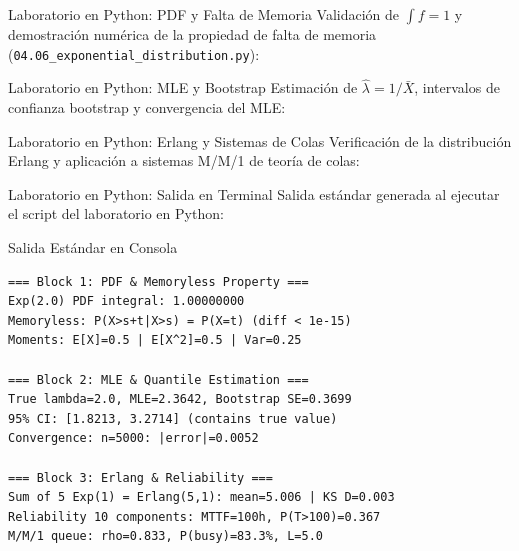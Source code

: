 \documentclass[10pt, aspectratio=169]{beamer}
\begin{document}
\begin{frame}[fragile]{Laboratorio en Python: PDF y Falta de Memoria}
  \scriptsize
  Validación de $\int f = 1$ y demostración numérica de la propiedad de falta de memoria (\texttt{04.06\_exponential\_distribution.py}):
  \vspace{0.02cm}
  {
  }
\end{frame}

\begin{frame}[fragile]{Laboratorio en Python: MLE y Bootstrap}
  \scriptsize
  Estimación de $\hat{\lambda} = 1/\bar{X}$, intervalos de confianza bootstrap y convergencia del MLE:
  \vspace{0.02cm}
  {
  }
\end{frame}

\begin{frame}[fragile]{Laboratorio en Python: Erlang y Sistemas de Colas}
  \scriptsize
  Verificación de la distribución Erlang y aplicación a sistemas M/M/1 de teoría de colas:
  \vspace{0.02cm}
  {
  }
\end{frame}

\begin{frame}[fragile]{Laboratorio en Python: Salida en Terminal}
  \scriptsize
  Salida estándar generada al ejecutar el script del laboratorio en Python:
  \vspace{0.02cm}
  \begin{block}{Salida Estándar en Consola}
    \fontsize{4pt}{5pt}\selectfont
    \begin{verbatim}
=== Block 1: PDF & Memoryless Property ===
Exp(2.0) PDF integral: 1.00000000
Memoryless: P(X>s+t|X>s) = P(X=t) (diff < 1e-15)
Moments: E[X]=0.5 | E[X^2]=0.5 | Var=0.25

=== Block 2: MLE & Quantile Estimation ===
True lambda=2.0, MLE=2.3642, Bootstrap SE=0.3699
95% CI: [1.8213, 3.2714] (contains true value)
Convergence: n=5000: |error|=0.0052

=== Block 3: Erlang & Reliability ===
Sum of 5 Exp(1) = Erlang(5,1): mean=5.006 | KS D=0.003
Reliability 10 components: MTTF=100h, P(T>100)=0.367
M/M/1 queue: rho=0.833, P(busy)=83.3%, L=5.0
    \end{verbatim}
  \end{block}
\end{frame}
\end{document}

